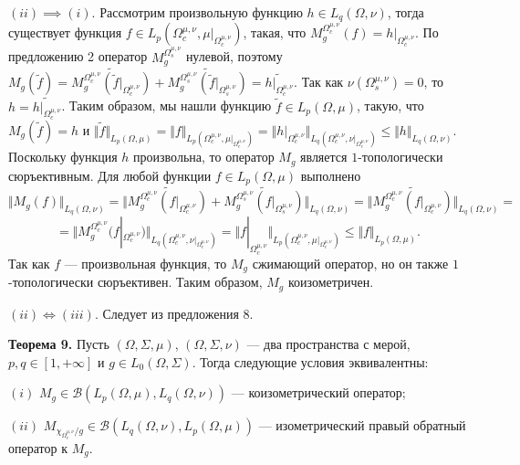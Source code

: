 \documentclass[11pt,twoside]{article}
\begin{document}
    $(ii)$$\implies$$ (i)$. Рассмотрим произвольную функцию $h\in
    L_q(\Omega,\nu)$, тогда существует функция $f\in
    L_p(\Omega_c^{\mu,\nu},\mu|_{\Omega_c^{\mu,\nu}})$, такая, что
    $M_g^{\Omega_c^{\mu,\nu}}(f)=h|_{\Omega_c^{\mu,\nu}}$. По предложению 2
        оператор $M_g^{\Omega_s^{\mu,\nu}}$ нулевой, поэтому $M_g(\widetilde{f})
    =\widetilde{M_g^{\Omega_c^{\mu,\nu}}
    (\widetilde{f}|_{\Omega_c^{\mu,\nu}})}
    +\widetilde{M_g^{\Omega_s^{\mu,\nu}}
    (\widetilde{f}|_{\Omega_s^{\mu,\nu}})}
    =\widetilde{h|_{\Omega_c^{\mu,\nu}}}$. Так как
    $\nu(\Omega_s^{\mu,\nu})=0$, то $h=\widetilde{h|_{\Omega_c^{\mu,\nu}}}$.
        Таким образом, мы нашли функцию $\widetilde{f}\in L_p(\Omega,\mu)$,
        такую, что $M_g(\widetilde{f})=h$ и $\Vert
    \widetilde{f}\Vert_{L_p(\Omega,\mu)}=\Vert
    f\Vert_{L_p(\Omega_c^{\mu,\nu},\mu|_{\Omega_c^{\mu,\nu}})}=
    \Vert
    h|_{\Omega_c^{\mu,\nu}}
    \Vert_{L_q(\Omega_c^{\mu,\nu},\nu|_{\Omega_c^{\mu,\nu}})}
    \leq\Vert h\Vert_{L_q(\Omega,\nu)}$. Поскольку функция $h$ произвольна,
        то оператор $M_g$ является $1$-топологически сюръективным. Для любой
        функции $f\in L_p(\Omega,\mu)$ выполнено
$$
    \Vert M_g(f)\Vert_{L_q(\Omega,\nu)}
    =\Vert
    \widetilde{M_g^{\Omega_c^{\mu,\nu}}(f|_{\Omega_c^{\mu,\nu}})}
    +\widetilde{M_g^{\Omega_s^{\mu,\nu}}(f|_{\Omega_s^{\mu,\nu}})}
    \Vert_{L_q(\Omega,\nu)}
    =\Vert
    \widetilde{M_g^{\Omega_c^{\mu,\nu}}(f|_{\Omega_c^{\mu,\nu}})}
    \Vert_{L_q(\Omega,\nu)}=
$$
$$
    =\Vert
    M_g^{\Omega_c^{\mu,\nu}}(f|_{\Omega_c^{\mu,\nu}})
    \Vert_{L_q(\Omega_c^{\mu,\nu},\nu|_{\Omega_c^{\mu,\nu}})}
    =\Vert
    f|_{\Omega_c^{\mu,\nu}}
    \Vert_{L_p(\Omega_c^{\mu,\nu},\mu|_{\Omega_c^{\mu,\nu}})}
    \leq\Vert f \Vert_{L_p(\Omega,\mu)}.
$$
Так как $f$ --- произвольная функция, то $M_g$ сжимающий оператор, но он также
$1$-топологически сюръективен. Таким образом, $M_g$ коизометричен.

$(ii)\Longleftrightarrow (iii)$. Следует из предложения 8.

\textbf{Теорема 9.} Пусть  $(\Omega,\Sigma,\mu)$, $(\Omega,\Sigma,\nu)$ --- два
пространства с мерой, $p,q\in[1,+\infty]$ и $g\in L_0(\Omega,\Sigma)$. Тогда
следующие условия эквивалентны:

$(i)$ $M_g\in\mathcal{B}(L_p(\Omega,\mu),L_q(\Omega,\nu))$ --- коизометрический
оператор;

$(ii)$ $M_{\chi_{\Omega_c^{\mu,\nu}}/g}\in
    \mathcal{B}(L_q(\Omega,\nu), L_p(\Omega,\mu))$ --- изометрический правый
обратный оператор к $M_g$.
\end{document}
